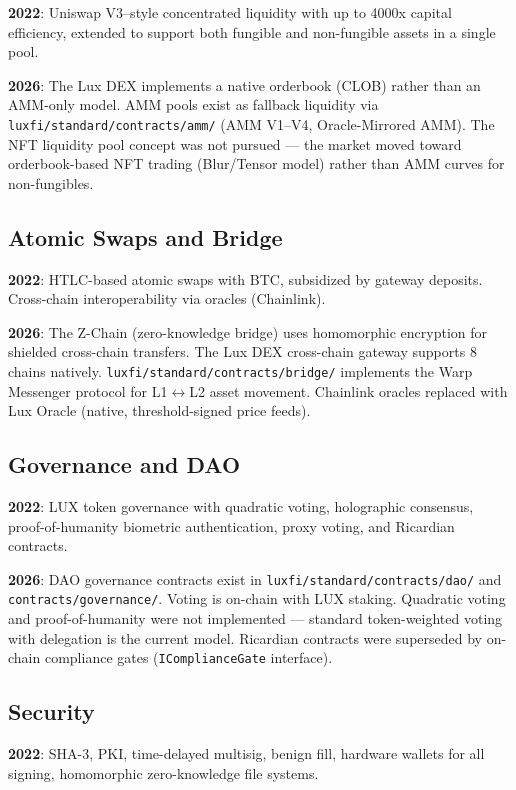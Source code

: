 \textbf{2022}: Uniswap V3--style concentrated liquidity with
up to 4000x capital efficiency, extended to support both
fungible and non-fungible assets in a single pool.

\textbf{2026}: The Lux DEX implements a native orderbook
(CLOB) rather than an AMM-only model. AMM pools exist as
fallback liquidity via \texttt{luxfi/standard/contracts/amm/}
(AMM V1--V4, Oracle-Mirrored AMM). The NFT liquidity pool
concept was not pursued --- the market moved toward
orderbook-based NFT trading (Blur/Tensor model) rather than
AMM curves for non-fungibles.

\subsection{Atomic Swaps and Bridge}

\textbf{2022}: HTLC-based atomic swaps with BTC, subsidized
by gateway deposits. Cross-chain interoperability via oracles
(Chainlink).

\textbf{2026}: The Z-Chain (zero-knowledge bridge) uses
homomorphic encryption for shielded cross-chain transfers.
The Lux DEX cross-chain gateway supports 8 chains natively.
\texttt{luxfi/standard/contracts/bridge/} implements the
Warp Messenger protocol for L1$\leftrightarrow$L2 asset
movement. Chainlink oracles replaced with Lux Oracle
(native, threshold-signed price feeds).

\subsection{Governance and DAO}

\textbf{2022}: LUX token governance with quadratic voting,
holographic consensus, proof-of-humanity biometric
authentication, proxy voting, and Ricardian contracts.

\textbf{2026}: DAO governance contracts exist in
\texttt{luxfi/standard/contracts/dao/} and
\texttt{contracts/governance/}. Voting is on-chain with
LUX staking. Quadratic voting and proof-of-humanity were
not implemented --- standard token-weighted voting with
delegation is the current model. Ricardian contracts were
superseded by on-chain compliance gates
(\texttt{IComplianceGate} interface).

\subsection{Security}

\textbf{2022}: SHA-3, PKI, time-delayed multisig, benign
fill, hardware wallets for all signing, homomorphic
zero-knowledge file systems.

